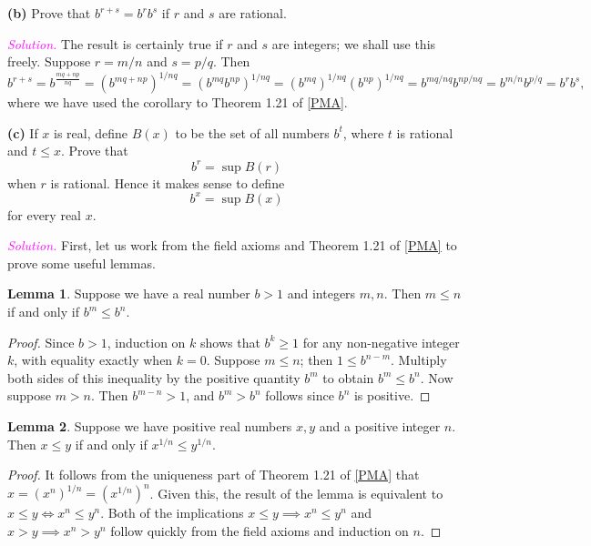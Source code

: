 \documentclass[12pt]{article}
\newcommand{\newp}{\vspace{5mm}}
\theoremstyle{definition}
\newtheorem{lemma}{Lemma}
\begin{document}
\textbf{(b)} Prove that \( b^{r + s} = b^r b^s \) if \( r \) and \( s \) are rational.

\newp

\textit{\textcolor{magenta}{Solution.}} The result is certainly true if \( r \) and \( s \) are integers; we shall use this freely. Suppose \( r = m/n \) and \( s = p/q \). Then
\[
b^{r + s} = b^{\frac{mq + np}{nq}} = (b^{mq + np})^{1/{nq}} = (b^{mq} b^{np})^{1/nq} = (b^{mq})^{1/nq} (b^{np})^{1/nq} = b^{mq/nq} b^{np/nq} = b^{m/n} b^{p/q} = b^r b^s,
\]
where we have used the corollary to Theorem 1.21 of \hyperlink{pma}{[PMA]}.

\newp

\textbf{(c)} If \( x \) is real, define \( B(x) \) to be the set of all numbers \( b^t \), where \( t \) is rational and \( t \leq x \). Prove that
\[
b^r = \sup B(r)
\]
when \( r \) is rational. Hence it makes sense to define
\[
b^x = \sup B(x)
\]
for every real \( x \).

\newp

\textit{\textcolor{magenta}{Solution.}} First, let us work from the field axioms and Theorem 1.21 of \hyperlink{pma}{[PMA]} to prove some useful lemmas.
\begin{lemma}
Suppose we have a real number \( b > 1 \) and integers \( m, n \). Then \( m \leq n \) if and only if \( b^m \leq b^n \).
\end{lemma}

\begin{proof}
Since \( b > 1 \), induction on \( k \) shows that \( b^k \geq 1 \) for any non-negative integer \( k \), with equality exactly when \( k = 0 \). Suppose \( m \leq n \); then \( 1 \leq b^{n-m} \). Multiply both sides of this inequality by the positive quantity \( b^m \) to obtain \( b^m \leq b^n \). Now suppose \( m > n \). Then \( b^{m-n} > 1 \), and \( b^m > b^n \) follows since \( b^n \) is positive.
\end{proof}

\begin{lemma}
Suppose we have positive real numbers \( x, y \) and a positive integer \( n \). Then \( x \leq y \) if and only if \( x^{1/n} \leq y^{1/n} \).
\end{lemma}

\begin{proof}
It follows from the uniqueness part of Theorem 1.21 of \hyperlink{pma}{[PMA]} that \( x = (x^n)^{1/n} = (x^{1/n})^n \). Given this, the result of the lemma is equivalent to \( x \leq y \iff x^n \leq y^n \). Both of the implications \( x \leq y \implies x^n \leq y^n \) and \( x > y \implies x^n > y^n \) follow quickly from the field axioms and induction on \( n \).
\end{proof}
\end{document}
